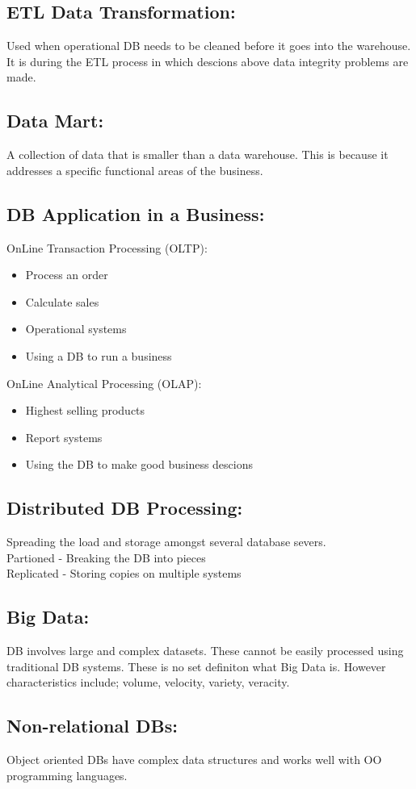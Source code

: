 \documentclass[a5paper]{article}
\begin{document}
	\subsection{ETL Data Transformation:}
	Used when operational DB needs to be cleaned before it goes into the warehouse. It is during the ETL process in which descions above data integrity problems are made.
	\subsection{Data Mart:}
	A collection of data that is smaller than a data warehouse. This is because it addresses a specific functional areas of the business.
	\subsection{DB Application in a Business:}
	OnLine Transaction Processing (OLTP):
	\begin{itemize}
		\item Process an order
		\item Calculate sales
		\item Operational systems
		\item Using a DB to run a business
	\end{itemize}
	OnLine Analytical Processing (OLAP):
	\begin{itemize}
		\item Highest selling products
		\item Report systems
		\item Using the DB to make good business descions
	\end{itemize}
	\subsection{Distributed DB Processing:}
	Spreading the load and storage amongst several database severs.\\
	Partioned - Breaking the DB into pieces\\
	Replicated - Storing copies on multiple systems
	\subsection{Big Data:}
	DB involves large and complex datasets. These cannot be easily processed using traditional DB systems. These is no set definiton what Big Data is. However characteristics include; volume, velocity, variety, veracity.
	\subsection{Non-relational DBs:}
	Object oriented DBs have complex data structures and works well with OO programming languages.
\end{document}
